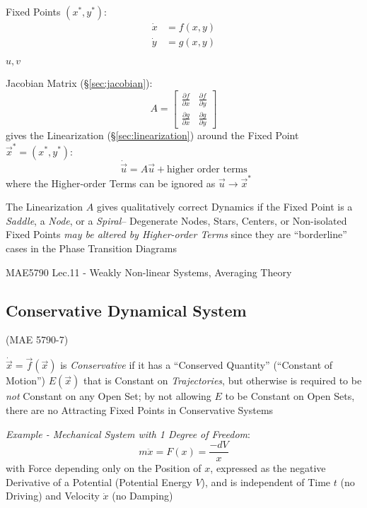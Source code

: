 Fixed Points $(x^*,y^*)$:
\begin{align*}
  \dot{x} & = f(x,y) \\
  \dot{y} & = g(x,y)
\end{align*}

$u, v$

Jacobian Matrix (\S\ref{sec:jacobian}):
\[
  A = \begin{bmatrix}
    \frac{\partial{f}}{\partial{x}} & \frac{\partial{f}}{\partial{y}} \\
    \frac{\partial{g}}{\partial{x}} & \frac{\partial{g}}{\partial{y}}
  \end{bmatrix}
\]
gives the Linearization (\S\ref{sec:linearization}) around the Fixed
Point $\vec{x}^* = (x^*, y^*)$:
\[
  \dot{\vec{u}} = A \vec{u} + \text{higher order terms}
\]
where the Higher-order Terms can be ignored as $\vec{u} \rightarrow \vec{x}^*$

The Linearization $A$ gives qualitatively correct Dynamics if the Fixed Point
is a \emph{Saddle}, a \emph{Node}, or a \emph{Spiral}--
Degenerate Nodes, Stars, Centers, or Non-isolated Fixed Points \emph{may be
altered by Higher-order Terms} since they are ``borderline'' cases in the Phase
Transition Diagrams

MAE5790 Lec.11 - Weakly Non-linear Systems, Averaging Theory



\subsection{Conservative Dynamical System}
\label{sec:conservative_dynamical_system}

(MAE 5790-7)

$\dot{\vec{x}} = \vec{f}(\vec{x})$ is \emph{Conservative} if it has a
``Conserved Quantity'' (``Constant of Motion'') $E(\vec{x})$ that is Constant
on \emph{Trajectories}, but otherwise is required to be \emph{not} Constant on
any Open Set;
by not allowing $E$ to be Constant on Open Sets, there are no Attracting Fixed
Points in Conservative Systems

\emph{Example - Mechanical System with 1 Degree of Freedom}:
\[
  m\ddot{x} = F(x) = \frac{-dV}{x}
\]
with Force depending only on the Position of $x$, expressed as the negative
Derivative of a Potential (Potential Energy $V$), and is independent of Time
$t$ (no Driving) and Velocity $\dot{x}$ (no Damping)

